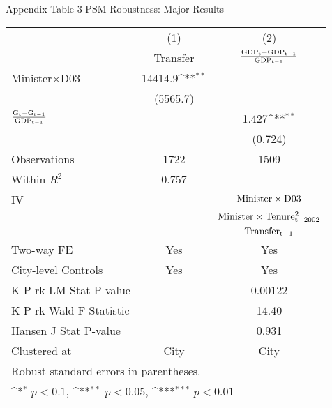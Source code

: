 \documentclass[11pt,a4paper]{article}
\begin{document}
\newpage
\begin{center}
Appendix Table 3 PSM Robustness: Major Results \\
\medskip
\begin{scriptsize}
{
\def\sym#1{\ifmmode^{#1}\else\(^{#1}\)\fi}
\begin{tabular}{l*{2}{c}}
\hline\hline
            &\multicolumn{1}{c}{(1)}&\multicolumn{1}{c}{(2)}\\
            &\multicolumn{1}{c}{Transfer}&\multicolumn{1}{c}{$\rm \frac{ GDP_{t}-GDP_{t-1}}{GDP_{t-1}}$}\\
\hline
Minister$\times$D03        &     14414.9\sym{**} &                     \\
            &    (5565.7)         &                     \\
[1em]
$\rm \frac{ G_{t}-G_{t-1}}{GDP_{t-1}}$   &                     &       1.427\sym{**} \\
            &                     &     (0.724)         \\
\hline
Observations         &        1722         &        1509         \\
Within $R^{2}$         &       0.757         &                     \\
IV         &         &  ${\rm Minister \times D03}$         \\
       &        &    ${\rm Minister \times Tenure_{t-2002}^2}$       \\
        &            &     $\rm Transfer_{t-1}$         \\
Two-way FE    &   Yes   & Yes      \\
City-level Controls &   Yes         &  Yes                \\
K-P rk LM Stat P-value         &                     &     0.00122         \\
K-P rk Wald F Statistic    &                     &       14.40         \\
Hansen J Stat P-value       &                     &       0.931         \\
Clustered at    &        City         &        City         \\
\hline\hline
\multicolumn{3}{l}{\footnotesize Robust standard errors in parentheses.}\\
\multicolumn{3}{l}{\footnotesize \sym{*} \(p<0.1\), \sym{**} \(p<0.05\), \sym{***} \(p<0.01\)}\\

\end{tabular}}
\end{scriptsize}
\end{center}
\end{document}
